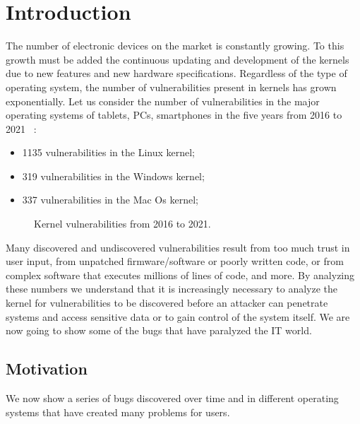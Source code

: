 \documentclass{masterthesis}
\newcommand{\vtnote}[1]{\todo[color=green!20]{#1}}
\begin{document}
\chapter{Introduction}
\label{ch:intro}
The number of electronic devices on the market is constantly growing.
To this growth must be added the continuous updating and development of the kernels due to new features and new hardware specifications. 
Regardless of the type of operating system, the number of vulnerabilities present in kernels has grown exponentially.
Let us consider the number of vulnerabilities in the major operating systems of tablets, PCs, smartphones in the five years from 2016 to 2021 ~\cite{cvedatail}: 
\begin{itemize}
\item 1135 vulnerabilities in the Linux kernel;
\item 319 vulnerabilities in the Windows kernel;
\item 337 vulnerabilities in the Mac Os kernel;
\end{itemize}
\begin{figure}[h!]
   \caption{Kernel vulnerabilities from 2016 to 2021.}
   \label{kernel_vulnerabilities}
\end{figure}
Many discovered and undiscovered vulnerabilities result from too much trust in user input, from unpatched firmware/software or poorly written code, or from complex software that executes millions of lines of code, and more.
By analyzing these numbers we understand that it is increasingly necessary to analyze the kernel for vulnerabilities to be discovered before an attacker can penetrate systems and access sensitive data or to gain control of the system itself.
We are now going to show some of the bugs that have paralyzed the IT world.





\section{Motivation}
\label{sect:motiv}
\vtnote{aggiunta frase di intro}
We now show a series of bugs discovered over time and in different operating systems that have created many problems for users.
\end{document}
